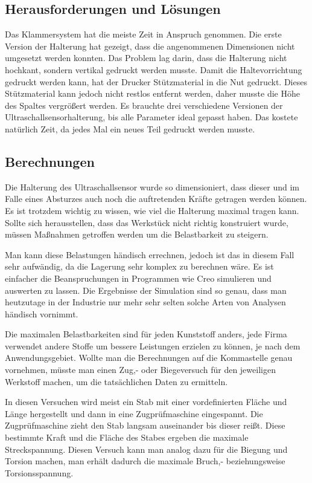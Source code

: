 	\subsection{Herausforderungen und Lösungen}

	Das Klammersystem hat die meiste Zeit in Anspruch genommen.
	Die erste Version der Halterung hat gezeigt, dass die angenommenen Dimensionen nicht umgesetzt werden konnten.
	Das Problem lag darin, dass die Halterung nicht hochkant, sondern vertikal gedruckt werden musste.
	Damit die Haltevorrichtung gedruckt werden kann, hat der Drucker Stützmaterial in die Nut gedruckt.
	Dieses Stützmaterial kann jedoch nicht restlos entfernt werden, daher musste die Höhe des Spaltes vergrößert werden.
	Es brauchte drei verschiedene Versionen der Ultraschallsensorhalterung, bis alle Parameter ideal gepasst haben. Das kostete natürlich Zeit, da jedes Mal ein neues Teil gedruckt werden musste.

			\newpage

	\subsection{Berechnungen}

	Die Halterung des Ultraschallsensor wurde so dimensioniert, dass dieser und im Falle eines Absturzes auch noch die auftretenden Kräfte getragen werden können.
	Es ist trotzdem wichtig zu wissen, wie viel die Halterung maximal tragen kann.
	Sollte sich herausstellen, dass das Werkstück nicht richtig konstruiert wurde, müssen Maßnahmen getroffen werden um die Belastbarkeit zu steigern.

	Man kann diese Belastungen händisch errechnen, jedoch ist das in diesem Fall sehr aufwändig, da die Lagerung sehr komplex zu berechnen wäre.
	Es ist einfacher die Beanspruchungen in Programmen wie Creo simulieren und auswerten zu lassen.
	Die Ergebnisse der Simulation sind so genau, dass man heutzutage in der Industrie nur mehr sehr selten solche Arten von Analysen händisch vornimmt.

	Die maximalen Belastbarkeiten sind für jeden Kunststoff anders, jede Firma verwendet andere Stoffe um bessere Leistungen erzielen zu können, je nach dem Anwendungsgebiet.
	Wollte man die Berechnungen auf die Kommastelle genau vornehmen, müsste man einen Zug,- oder Biegeversuch für den jeweiligen Werkstoff machen,
	um die tatsächlichen Daten zu ermitteln.

	In diesen Versuchen wird meist ein Stab mit einer vordefinierten Fläche und Länge hergestellt und dann in eine Zugprüfmaschine eingespannt.
	Die Zugprüfmaschine zieht den Stab langsam auseinander bis dieser reißt. Diese bestimmte Kraft und die Fläche des Stabes ergeben die maximale Streckspannung.
	Diesen Versuch kann man analog dazu für die Biegung und Torsion machen, man erhält dadurch die maximale Bruch,- beziehungsweise Torsionsspannung.


